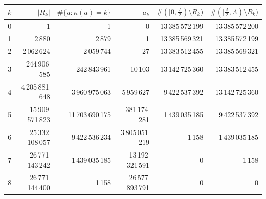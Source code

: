 \begin{tabular}{rrrrrr}
\toprule
$k$ & $|R_k|$ & $\#\{a:\kappa(a)=k\}$ & $a_k$ & $\#([0,\frac{\Lambda}{2})\setminus R_k)$ & $\#([\frac{\Lambda}{2},\Lambda)\setminus R_k)$\\
\midrule
0 & 1 & 1 & 0 & 13\,385\,572\,199 & 13\,385\,572\,200\\
1 & 2\,880 & 2\,879 & 1 & 13\,385\,569\,321 & 13\,385\,572\,199\\
2 & 2\,062\,624 & 2\,059\,744 & 27 & 13\,383\,512\,455 & 13\,385\,569\,321\\
3 & 244\,906\,585 & 242\,843\,961 & 10\,103 & 13\,142\,725\,360 & 13\,383\,512\,455\\
4 & 4\,205\,881\,648 & 3\,960\,975\,063 & 5\,959\,627 & 9\,422\,537\,392 & 13\,142\,725\,360\\
5 & 15\,909\,571\,823 & 11\,703\,690\,175 & 381\,174\,281 & 1\,439\,035\,185 & 9\,422\,537\,392\\
6 & 25\,332\,108\,057 & 9\,422\,536\,234 & 3\,805\,051\,219 & 1\,158 & 1\,439\,035\,185\\
7 & 26\,771\,143\,242 & 1\,439\,035\,185 & 13\,192\,321\,591 & 0 & 1\,158\\
8 & 26\,771\,144\,400 & 1\,158 & 26\,577\,893\,791 & 0 & 0\\
\bottomrule
\end{tabular}